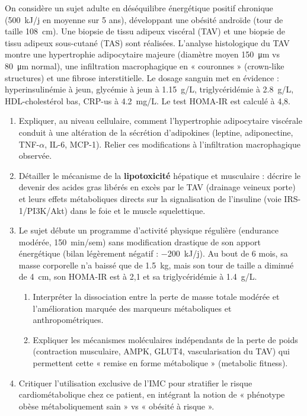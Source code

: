 \documentclass[11pt]{article}
\begin{document}
\begin{exercice}
On considère un sujet adulte en déséquilibre énergétique positif chronique (\SI{+500}{kJ/j} en moyenne sur 5 ans), développant une obésité androïde (tour de taille \SI{108}{cm}). Une biopsie de tissu adipeux viscéral (TAV) et une biopsie de tissu adipeux sous-cutané (TAS) sont réalisées. L'analyse histologique du TAV montre une hypertrophie adipocytaire majeure (diamètre moyen \SI{150}{\micro m} vs \SI{80}{\micro m} normal), une infiltration macrophagique en « couronnes » (crown-like structures) et une fibrose interstitielle. Le dosage sanguin met en évidence : hyperinsulinémie à jeun, glycémie à jeun à \SI{1,15}{g/L}, triglycéridémie à \SI{2,8}{g/L}, HDL-cholestérol bas, CRP-us à \SI{4,2}{mg/L}. Le test HOMA-IR est calculé à 4,8.

\begin{enumerate}
    \item Expliquer, au niveau cellulaire, comment l'hypertrophie adipocytaire viscérale conduit à une altération de la sécrétion d'adipokines (leptine, adiponectine, TNF-$\alpha$, IL-6, MCP-1). Relier ces modifications à l'infiltration macrophagique observée.
    \item Détailler le mécanisme de la \textbf{lipotoxicité} hépatique et musculaire : décrire le devenir des acides gras libérés en excès par le TAV (drainage veineux porte) et leurs effets métaboliques directs sur la signalisation de l'insuline (voie IRS-1/PI3K/Akt) dans le foie et le muscle squelettique.
    \item Le sujet débute un programme d'activité physique régulière (endurance modérée, \SI{150}{min/sem}) sans modification drastique de son apport énergétique (bilan légèrement négatif : \SI{-200}{kJ/j}). Au bout de 6 mois, sa masse corporelle n'a baissé que de \SI{1,5}{kg}, mais son tour de taille a diminué de \SI{4}{cm}, son HOMA-IR est à 2,1 et sa triglycéridémie à \SI{1,4}{g/L}.
    \begin{enumerate}
        \item Interpréter la dissociation entre la perte de masse totale modérée et l'amélioration marquée des marqueurs métaboliques et anthropométriques.
        \item Expliquer les mécanismes moléculaires indépendants de la perte de poids (contraction musculaire, AMPK, GLUT4, vascularisation du TAV) qui permettent cette « remise en forme métabolique » (metabolic fitness).
    \end{enumerate}
    \item Critiquer l'utilisation exclusive de l'IMC pour stratifier le risque cardiométabolique chez ce patient, en intégrant la notion de « phénotype obèse métaboliquement sain » vs « obésité à risque ».
\end{enumerate}
\end{exercice}
\end{document}
